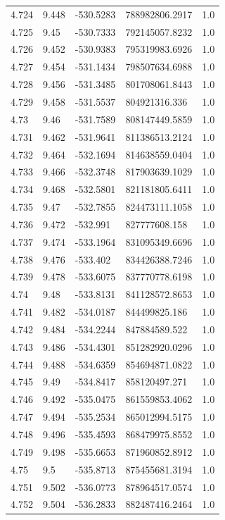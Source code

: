 \begin{tabular}{lllll}
4.724 & 9.448 & -530.5283 & 788982806.2917 & 1.0 \\
4.725 & 9.45 & -530.7333 & 792145057.8232 & 1.0 \\
4.726 & 9.452 & -530.9383 & 795319983.6926 & 1.0 \\
4.727 & 9.454 & -531.1434 & 798507634.6988 & 1.0 \\
4.728 & 9.456 & -531.3485 & 801708061.8443 & 1.0 \\
4.729 & 9.458 & -531.5537 & 804921316.336 & 1.0 \\
4.73 & 9.46 & -531.7589 & 808147449.5859 & 1.0 \\
4.731 & 9.462 & -531.9641 & 811386513.2124 & 1.0 \\
4.732 & 9.464 & -532.1694 & 814638559.0404 & 1.0 \\
4.733 & 9.466 & -532.3748 & 817903639.1029 & 1.0 \\
4.734 & 9.468 & -532.5801 & 821181805.6411 & 1.0 \\
4.735 & 9.47 & -532.7855 & 824473111.1058 & 1.0 \\
4.736 & 9.472 & -532.991 & 827777608.158 & 1.0 \\
4.737 & 9.474 & -533.1964 & 831095349.6696 & 1.0 \\
4.738 & 9.476 & -533.402 & 834426388.7246 & 1.0 \\
4.739 & 9.478 & -533.6075 & 837770778.6198 & 1.0 \\
4.74 & 9.48 & -533.8131 & 841128572.8653 & 1.0 \\
4.741 & 9.482 & -534.0187 & 844499825.186 & 1.0 \\
4.742 & 9.484 & -534.2244 & 847884589.522 & 1.0 \\
4.743 & 9.486 & -534.4301 & 851282920.0296 & 1.0 \\
4.744 & 9.488 & -534.6359 & 854694871.0822 & 1.0 \\
4.745 & 9.49 & -534.8417 & 858120497.271 & 1.0 \\
4.746 & 9.492 & -535.0475 & 861559853.4062 & 1.0 \\
4.747 & 9.494 & -535.2534 & 865012994.5175 & 1.0 \\
4.748 & 9.496 & -535.4593 & 868479975.8552 & 1.0 \\
4.749 & 9.498 & -535.6653 & 871960852.8912 & 1.0 \\
4.75 & 9.5 & -535.8713 & 875455681.3194 & 1.0 \\
4.751 & 9.502 & -536.0773 & 878964517.0574 & 1.0 \\
4.752 & 9.504 & -536.2833 & 882487416.2464 & 1.0 \\

\end{tabular}
